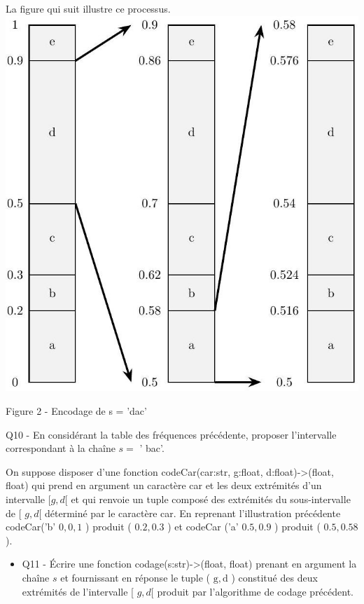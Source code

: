 \documentclass[10pt]{article}
\begin{document}
La figure qui suit illustre ce processus.\\
\includegraphics[max width=\textwidth, center]{2025_04_25_b5f58c3e8cc704f29fe4g-06}

Figure 2 - Encodage de s = 'dac'

Q10 - En considérant la table des fréquences précédente, proposer l'intervalle correspondant à la chaîne $s=$ ' bac'.

On suppose disposer d'une fonction codeCar(car:str, g:float, d:float)->(float, float) qui prend en argument un caractère car et les deux extrémités d'un intervalle $[g, d[$ et qui renvoie un tuple composé des extrémités du sous-intervalle de [ $g, d[$ déterminé par le caractère car. En reprenant l'illustration précédente codeCar('b' $0,0,1$ ) produit ( $0.2,0.3$ ) et codeCar ('a' $0.5,0.9$ ) produit ( $0.5,0.58$ ).

\begin{itemize}
  \item Q11 - Écrire une fonction codage(s:str)->(float, float) prenant en argument la chaîne $s$ et fournissant en réponse le tuple ( $\mathrm{g}, \mathrm{d}$ ) constitué des deux extrémités de l'intervalle [ $g, d[$ produit par l'algorithme de codage précédent.
\end{itemize}
\end{document}
